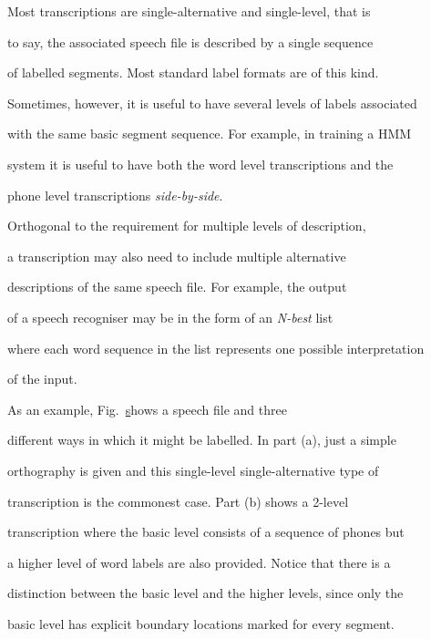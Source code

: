 




Most transcriptions are single-alternative and single-level, that is


to say, the associated speech file is described by a single sequence


of labelled segments.  Most standard label formats are of this kind.


Sometimes, however, it is useful to have several levels of labels associated


with the same basic segment sequence.   For example, in training a HMM


system it is useful to have both the word level transcriptions and the


phone level transcriptions \textit{side-by-side}.  





Orthogonal to the requirement for multiple levels of description,


a transcription may also need to include multiple alternative


descriptions of the same speech file.  For example, the output


of a speech recogniser may be in the form of an \textit{N-best} list


where each word sequence in the list represents one possible interpretation


of the input.





As an example, Fig.~\href{f:labegs} shows a speech file and three


different ways in which it might be labelled.  In part (a), just a simple


orthography is given and this single-level single-alternative type of


transcription is the  commonest case. Part (b) shows a 2-level


transcription  where the basic level consists of a sequence of phones but


a higher level of word labels are also provided.  Notice that there is a


distinction between the basic level and the higher levels, since only the


basic level has explicit boundary locations marked for every segment. 


